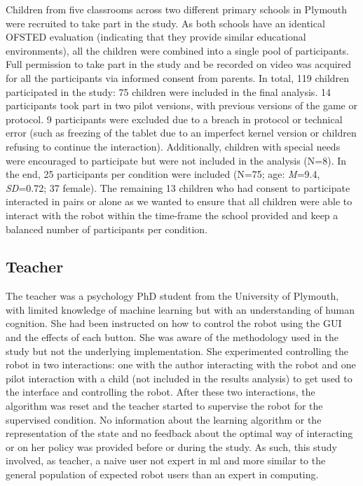 Children from five classrooms across two different primary schools in Plymouth were recruited to take part in the study. As both schools have an identical OFSTED evaluation (indicating that they provide similar educational environments), all the children were combined into a single pool of participants. Full permission to take part in the study and be recorded on video was acquired for all the participants via informed consent from parents. In total, 119 children participated in the study: 75 children were included in the final analysis. 14 participants took part in two pilot versions, with previous versions of the game or protocol. 9 participants were excluded due to a breach in protocol or technical error (such as freezing of the tablet due to an imperfect kernel version or children refusing to continue the interaction). Additionally, children with special needs were encouraged to participate but were not included in the analysis (N=8). In the end, 25 participants per condition were included (N=75; age: \textit{M}=9.4, \textit{SD}=0.72; 37 female). The remaining 13 children who had consent to participate interacted in pairs or alone as we wanted to ensure that all children were able to interact with the robot within the time-frame the school provided and keep a balanced number of participants per condition. 

\subsection{Teacher}

The teacher was a psychology PhD student from the University of Plymouth, with limited knowledge of machine learning but with an understanding of human cognition. She had been instructed on how to control the robot using the GUI and the effects of each button. She was aware of the methodology used in the study but not the underlying implementation. She experimented controlling the robot in two interactions: one with the author interacting with the robot and one pilot interaction with a child (not included in the results analysis) to get used to the interface and controlling the robot. After these two interactions, the algorithm was reset and the teacher started to supervise the robot for the supervised condition. No information about the learning algorithm or the representation of the state and no feedback about the optimal way of interacting or on her policy was provided before or during the study. As such, this study involved, as teacher, a naive user not expert in \gls{ml} and more similar to the general population of expected robot users than an expert in computing.

